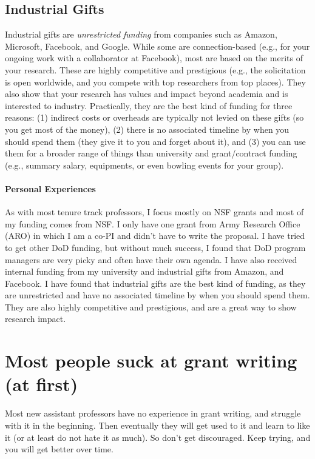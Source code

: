 \documentclass[oneside,11pt,dvipsnames]{book}
\begin{document}
\subsection{Industrial Gifts}
Industrial gifts are \emph{unrestricted funding} from companies such as Amazon, Microsoft, Facebook, and Google. While some are connection-based (e.g., for your ongoing work with a collaborator at Facebook), most are based on the merits of your research.
These are highly competitive and prestigious (e.g., the solicitation is open worldwide, and you compete with top researchers from top places).  
They also show that your research has values and impact beyond academia and is interested to industry. Practically, they are the best kind of funding for three reasons: (1) indirect costs or overheads are typically not levied on these gifts (so you get most of the money), (2) there is no associated timeline by when you should spend them (they give it to you and forget about it), and (3) you can use them for a broader range of things than university and grant/contract funding (e.g., summary salary, equipments, or even bowling events for your group).

\paragraph{Personal Experiences}
As with most tenure track professors, I focus mostly on NSF grants and most of my funding comes from NSF.  I only have one grant from Army Research Office (ARO) in which I am a co-PI and didn't have to write the proposal. I have tried to get other DoD funding, but without much success, I found that DoD program managers are very picky and often have their own agenda.  I have also received internal funding from my university and industrial gifts from Amazon, and Facebook.  I have found that industrial gifts are the best kind of funding, as they are unrestricted and have no associated timeline by when you should spend them.  They are also highly competitive and prestigious, and are a great way to show research impact.

\section{Most people suck at grant writing (at first)} Most new assistant professors have no experience in grant writing, and struggle with it in the beginning.  Then eventually they will get used to it and learn to like it (or at least do not hate it as much).  So don't get discouraged.  Keep trying, and you will get better over time.
\end{document}
